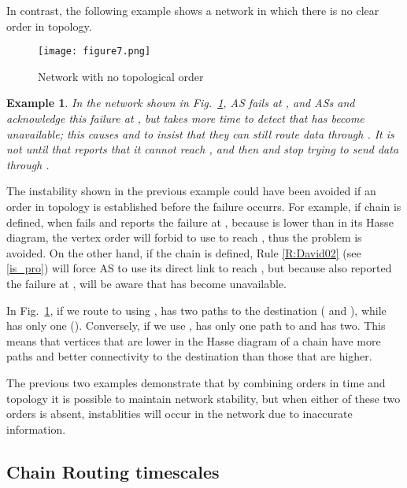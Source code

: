\documentclass[5p,twocolumn]{elsarticle}
\newtheorem{example}{Example}
\begin{document}
In contrast, the following example shows a network in which there is no clear order in topology.

\begin{figure}[!t]
	\centering
		\texttt{[image: figure7.png]}
	\caption{Network with no topological order}
	\label{fig:74_TopoOrder}
\end{figure}

\begin{example}
In the network shown in Fig.\ \ref{fig:74_TopoOrder}, AS  fails at , and ASs  and  acknowledge this failure at , but  takes more time to detect that  has become unavailable; this causes  and  to insist that they can still route data through . It is not until  that  reports that it cannot reach , and then  and  stop trying to send data through .
\end{example}

The instability shown in the previous example could have been avoided if an order in topology is established before the failure occurrs. For example, if chain  is defined, when  fails and  reports the failure at , because  is lower than  in its Hasse diagram, the vertex order will forbid  to use  to reach , thus the problem is avoided. On the other hand, if the chain  is defined, Rule \ref{R:David02} (see \ref{is_pro}) will force AS  to use its direct link  to reach , but because  also reported the failure at ,  will be aware that  has become unavailable.

In Fig.\ \ref{fig:74_TopoOrder}, if we route to  using ,  has two paths to the destination ( and ), while  has only one (). Conversely, if we use  ,  has only one path to  and  has two. This means that vertices that are lower in the Hasse diagram of a chain have more paths and better connectivity to the destination than those that are higher.

The previous two examples demonstrate that by combining orders in time and topology it is possible to maintain network stability, but when either of these two orders is absent, instablities will occur in the network due to inaccurate information.


\subsection{Chain Routing timescales}\label{timescales}
\end{document}
